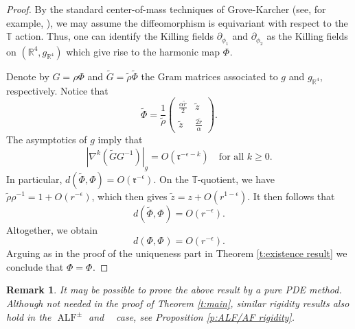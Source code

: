 \documentclass[a4paper,11pt]{amsart}
\newtheorem{remark}[theorem]{Remark}
\theoremstyle{definition}
\numberwithin{equation}{section}
\newcommand{\p}{\partial}
\newcommand{\R}{\mathbb{R}}
\DeclareMathOperator{\Aea}{AE_\alpha}
\DeclareMathOperator{\ALF}{ALF}
\DeclareMathOperator{\AFa}{AF_\beta}
\begin{document}
\begin{proof}
By the standard center-of-mass techniques of Grove-Karcher (see, for example, \cite{Rong}), we may assume the diffeomorphism is equivariant with respect to the \( \mathbb{T} \) action. Thus, one can identify the Killing fields \( \p_{\phi_1} \) and \( \p_{\phi_2} \) as the Killing fields on \( (\mathbb{R}^4, g_{\R^4}) \) which give rise to the harmonic map \( \Phi^{\Aea} \).  

Denote by \( G = \rho \Phi \) and \( \widetilde{G} = \widetilde{\rho} \widetilde{\Phi} \) the Gram matrices associated to \( g \) and \( g_{\mathbb{R}^4} \), respectively. Notice that  
\[
\widetilde{\Phi} = \frac{1}{\widetilde{\rho}}  \left(
\begin{matrix}  
\frac{\alpha \widetilde{r}}{2} & \widetilde{z} \\  
\widetilde{z} & \frac{2\widetilde{r}}{\alpha}  
\end{matrix}\right).  
\]
The asymptotics of \( g \) imply that  
\[
|\nabla^k(\widetilde{G} G^{-1})|_{g} = O(\mathfrak{r}^{-\epsilon-k}) \quad \text{for all } k \geq 0.
\]
In particular, \( d(\widetilde{\Phi}, \Phi) = O(\mathfrak{r}^{-\epsilon}) \). On the \( \mathbb{T} \)-quotient, we have \( \widetilde{\rho} \rho^{-1} = 1 + O(r^{-\epsilon}) \), which then gives \( \widetilde{z} = z + O(r^{1-\epsilon}) \). It then follows that  
\[
d(\widetilde{\Phi}, \Phi^{\Aea}) = O(r^{-\epsilon}).
\]
Altogether, we obtain  
\[
d(\Phi, \Phi^{\Aea}) = O(r^{-\epsilon}).
\]
Arguing as in the proof of the uniqueness part in Theorem \ref{t:existence result} we conclude that $\Phi=\Phi^{\Aea}$.


  
\end{proof}


\begin{remark}\label{rem:TN AF rigidity}
    It may be possible to prove the above result by a pure PDE method. Although not needed in the proof of Theorem \ref{t:main}, similar rigidity results also hold in the $\ALF^\pm$ and $\AFa$ case, see Proposition \ref{p:ALF/AF rigidity}.  
\end{remark}
\end{document}
